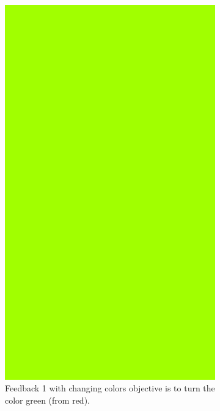 \documentclass[a4paper,10pt,english,lof,lot,twoside]{puthesis}
\begin{document}
\begin{figure}
\centering
\capstart
\begin{subfigure}[t]{0.30\linewidth}
\centering
\capstart

\includegraphics[width=0.800\linewidth]{final-prototype-feedback-1-box-colors.png}
\caption[Feedback 1 with changing colors.]{Feedback 1 with changing colors objective is to turn the color
green (from red).}\label{ch-design/index:fig-final-prototype-feedback-1-box-colors}\end{subfigure}
\begin{subfigure}[t]{0.30\linewidth}
\centering
\capstart


\end{subfigure}
\end{figure}
\end{document}
